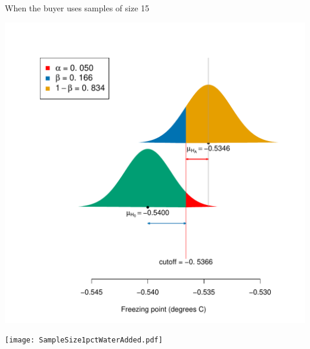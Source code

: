 \documentclass[10pt,handout]{beamer}\usepackage[]{graphicx}\usepackage[]{color}
\makeatletter
\def\maxwidth{ %
  \ifdim\Gin@nat@width>\linewidth
    \linewidth
  \else
    \Gin@nat@width
  \fi
}
\newenvironment{knitrout}{}{} %
\makeatother
\begin{document}
\begin{frame}[fragile]{When the buyer uses samples of size 15}
\begin{knitrout}\tiny
{}\color{fgcolor}

{\centering \includegraphics[width=\maxwidth]{figure/unnamed-chunk-14-1} 

}


\end{knitrout}
\end{frame}


\begin{frame}
	\begin{center}
		\texttt{[image: SampleSize1pctWaterAdded.pdf]} 
	\end{center}
\end{frame}
\end{document}
